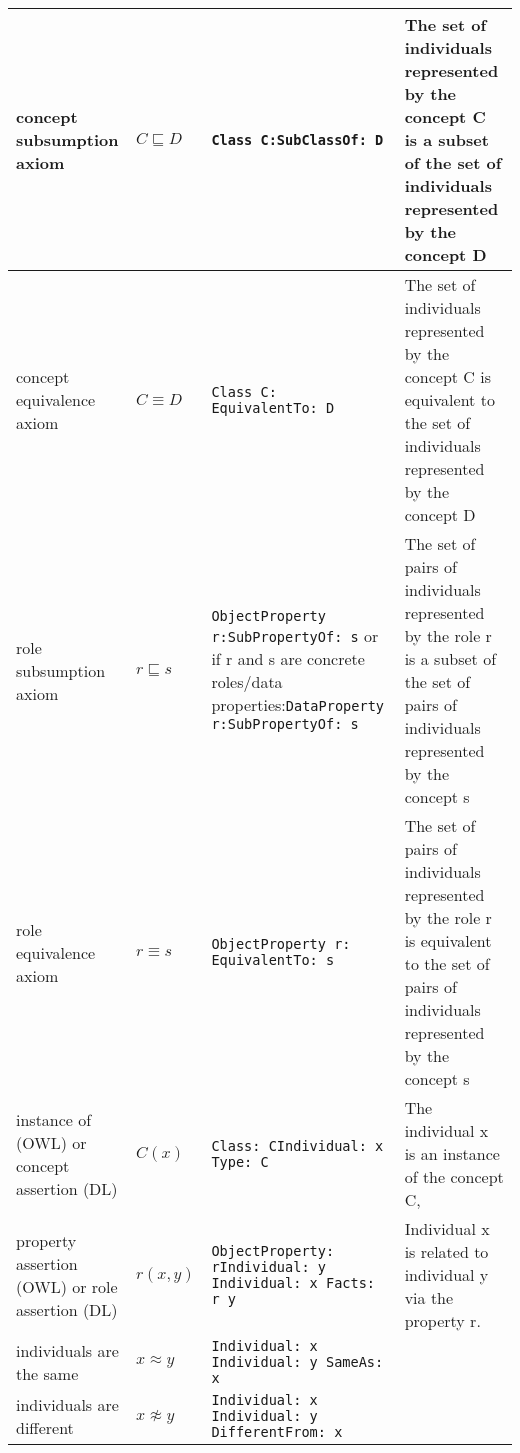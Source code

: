 \documentclass{amsart}
\begin{document}
\begin{longtable}{|>{\footnotesize}p{2.5cm}|>{\footnotesize}p{1.5cm}|>{\footnotesize}p{3.5cm}|>{\footnotesize}p{5cm}|}
			concept subsumption axiom & $C \sqsubseteq D$ & \texttt{Class C:\newline SubClassOf: D} & The set of individuals represented by the concept C is a subset of the set of individuals represented by the concept D\\
			\hline	
			concept equivalence axiom & $C \equiv D$ & \texttt{Class C: \newline EquivalentTo: D} & The set of individuals represented by the concept C is equivalent to the set of individuals represented by the concept D\\
			\hline
			role subsumption axiom & $r \sqsubseteq s$ & \texttt{ObjectProperty r:\newline SubPropertyOf: s} or if r and s are concrete roles/data properties:\newline \texttt{DataProperty r:\newline SubPropertyOf: s} & The set of pairs of individuals represented by the role r is a subset of the set of pairs of individuals represented by the concept s\\
			\hline	
			role equivalence axiom & $r \equiv s$ & \texttt{ObjectProperty r: \newline EquivalentTo: s} & The set of pairs of individuals represented by the role r is equivalent to the set of pairs of individuals represented by the concept s\\
			\hline
			instance of (OWL) or concept assertion (DL) & $C(x)$ & \texttt{Class: C\newline Individual: x \newline Type: C} & The individual x is an instance of the concept C, \\
			\hline
			property assertion (OWL) or role assertion (DL) & $r(x, y)$ & \texttt{ObjectProperty: r\newline Individual: y \newline Individual: x \newline Facts: r y}  &  Individual x is related to individual y via the property r.\\  
			\hline
			individuals are the same & $x \approx y$ & \texttt{Individual: x \newline Individual: y \newline SameAs: x}& \\ 		
			\hline	
			individuals are different & $x \not\approx y$ & \texttt{Individual: x \newline Individual: y \newline DifferentFrom: x} & \\ 		

\end{longtable}
\end{document}
